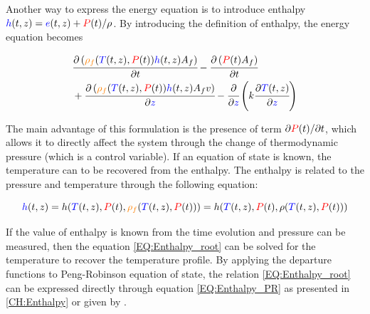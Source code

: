 \documentclass[../Article_Model_Parameters.tex]{subfiles}
\begin{document}
			Another way to express the energy equation is to introduce enthalpy ${\color{blue}h}(t,z) = {\color{blue}e}(t,z) + {\color{red}P}(t) / \rho$. By introducing the definition of enthalpy, the energy equation becomes
			
			{\footnotesize
				\begin{align}
					&\cfrac{\partial \left({\color{orange}\rho_f}({\color{blue}T}(t,z),{\color{red}P}(t)) {\color{blue}h}(t,z) A_f\right)}{\partial t} - \cfrac{\partial \left({\color{red}P}(t) A_f\right)}{\partial t} \nonumber \\
					&+ \cfrac{\partial \left( {\color{orange}\rho_f}({\color{blue}T}(t,z),{\color{red}P}(t)) {\color{blue}h}(t,z) A_f v \right)}{\partial {\color{blue}z}} - \cfrac{\partial}{\partial {\color{blue}z}} \left( k \cfrac{\partial {\color{blue}T}(t,z)}{\partial {\color{blue}z}} \right)
				\end{align}
			}
		
			The main advantage of this formulation is the presence of term $\partial {\color{red}P}(t) / \partial t $, which allows it to directly affect the system through the change of thermodynamic pressure (which is a control variable).
			If an equation of state is known, the temperature can to be recovered from the enthalpy. The enthalpy is related to the pressure and temperature through the following equation:
			
			{\footnotesize
				\begin{equation}
					{\color{blue}h}(t,z)=h({\color{blue}T}(t,z),{\color{red}P}(t),{\color{orange}\rho_f}({\color{blue}T}(t,z),{\color{red}P}(t)))=h( {\color{blue}T}(t,z),{\color{red}P}(t), \rho({\color{blue}T}(t,z),{\color{red}P}(t)) ) 
					\label{EQ:Enthalpy_root}
				\end{equation}
			}
		
			If the value of enthalpy is known from the time evolution and pressure can be measured, then the equation \ref{EQ:Enthalpy_root} can be solved for the temperature to recover the temperature profile. By applying the departure functions to Peng-Robinson equation of state, the relation \ref{EQ:Enthalpy_root} can be expressed directly through equation \ref{EQ:Enthalpy_PR} as presented in \ref{CH:Enthalpy} or given by \citet{Gmehling2019}.
			
\end{document}
